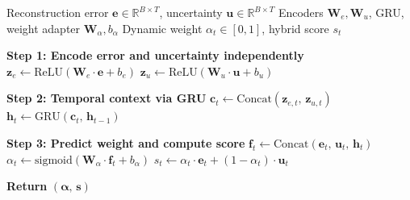 \begin{algorithm}[H]
\footnotesize
\caption{Dynamic Weight Adaptation for Hybrid Anomaly Scoring}
\label{alg:dynamic_weight}
\begin{algorithmic}
\Require Reconstruction error $\mathbf{e} \in \mathbb{R}^{B \times T}$, uncertainty $\mathbf{u} \in \mathbb{R}^{B \times T}$
\Require Encoders $\mathbf{W}_e, \mathbf{W}_u$, GRU, weight adapter $\mathbf{W}_\alpha, b_\alpha$
\Ensure Dynamic weight $\alpha_t \in [0,1]$, hybrid score $s_t$

\State \textbf{Step 1: Encode error and uncertainty independently}
\State $\mathbf{z}_e \gets \text{ReLU}(\mathbf{W}_e \cdot \mathbf{e} + b_e)$
\State $\mathbf{z}_u \gets \text{ReLU}(\mathbf{W}_u \cdot \mathbf{u} + b_u)$

\State \textbf{Step 2: Temporal context via GRU}
\State $\mathbf{c}_t \gets \text{Concat}(\mathbf{z}_{e,t},\, \mathbf{z}_{u,t})$
    \State $\mathbf{h}_t \gets \text{GRU}(\mathbf{c}_t,\, \mathbf{h}_{t-1})$
\EndFor

\State \textbf{Step 3: Predict weight and compute score}
    \State $\mathbf{f}_t \gets \text{Concat}(\mathbf{e}_t,\, \mathbf{u}_t,\, \mathbf{h}_t)$
    \State $\alpha_t \gets \text{sigmoid}(\mathbf{W}_\alpha \cdot \mathbf{f}_t + b_\alpha)$
    \State $s_t \gets \alpha_t \cdot \mathbf{e}_t + (1 - \alpha_t) \cdot \mathbf{u}_t$
\EndFor

\State \textbf{Return} $(\boldsymbol{\alpha},\, \mathbf{s})$
\end{algorithmic}
\end{algorithm}
